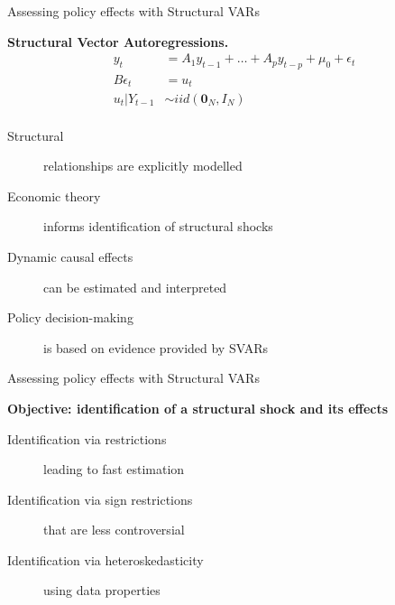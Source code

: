 \documentclass[notes,blackandwhite,mathsans]{beamer}
\begin{document}
\begin{frame}{Assessing policy effects with Structural VARs}

\textbf{Structural Vector Autoregressions.}
\begin{align*}
y_t &= A_1 y_{t-1} + \dots + A_p y_{t-p}  + \mu_0 + \epsilon_t\\[1ex]
B\epsilon_t &= u_t \\[1ex]
u_t|Y_{t-1} &\sim iid\left(\mathbf{0}_N,I_N\right)\\
\end{align*}

\begin{description}
\item[Structural] {\color{mcxs2}relationships are explicitly modelled} 
\item[Economic theory] {\color{mcxs2}informs identification of structural shocks} 
\item[Dynamic causal effects] {\color{mcxs2}can be estimated and interpreted} 
\item[Policy decision-making] {\color{mcxs2}is based on evidence provided by SVARs}
\end{description}
\end{frame}





\begin{frame}{Assessing policy effects with Structural VARs}

\textbf{Objective: identification of a structural shock and its effects}
\bigskip
\begin{description}
\item[Identification via restrictions] {\color{mcxs2}leading to fast estimation} \\[1ex]
\item[Identification via sign restrictions] {\color{mcxs2}that are less controversial} \\[1ex]
\item[Identification via heteroskedasticity] {\color{mcxs2}using data properties} 
\end{description}
\end{frame}
\end{document}
